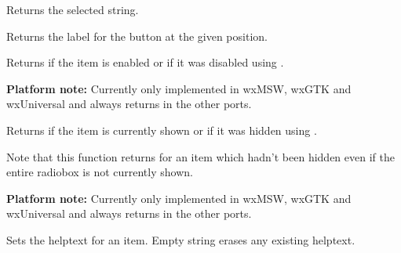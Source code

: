 \label{wxradioboxgetstringselection}


Returns the selected string.


\label{wxradioboxgetstring}


Returns the label for the button at the given position.




\label{wxradioboxisitemenabled}


Returns \true if the item is enabled or \false if it was disabled using
.

{\bf Platform note:} Currently only implemented in wxMSW, wxGTK and wxUniversal
and always returns \true in the other ports.




\label{wxradioboxisitemshown}


Returns \true if the item is currently shown or \false if it was hidden using
.

Note that this function returns \true for an item which hadn't been hidden even
if the entire radiobox is not currently shown.

{\bf Platform note:} Currently only implemented in wxMSW, wxGTK and wxUniversal
and always returns \true in the other ports.




\label{wxradioboxsetitemhelptext}


Sets the helptext for an item. Empty string erases any existing helptext.


